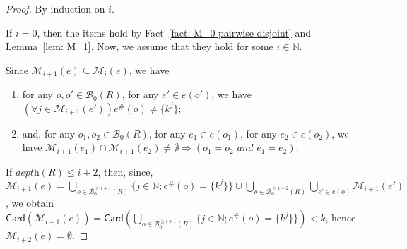 \documentclass{article}
\theoremstyle{plain}
\newcommand{\Nat}{\ensuremath{\mathbb{N}}}
\newcommand{\Card}[1]{\textsf{Card}\left( #1 \right)}
\newcommand{\boxesatzero}[1]{\mathcal{B}_{0}(#1)}
\newcommand{\boxesatzerogeq}[2]{\mathcal{B}_0^{\geq #2}(#1)}
\begin{document}
\begin{proof}
By induction on $i$. 

If $i = 0$, then the items hold by Fact~\ref{fact: M_0 pairwise disjoint} and Lemma~\ref{lem: M_1}. Now, we assume that they hold for some $i \in \Nat$.

Since $\mathcal{M}_{i+1}(e) \subseteq \mathcal{M}_i(e)$, we have 
\begin{enumerate}
\item for any $o, o' \in \boxesatzero{R}$, for any $e' \in e(o')$, we have $(\forall j \in \mathcal{M}_{i+1}(e')) e^\#(o) \not= \{ k^j \}$;
\item and, for any $o_1, o_2 \in \boxesatzero{R}$, for any $e_1 \in e(o_1)$, for any $e_2 \in e(o_2)$, we have $\mathcal{M}_{i+1}(e_1) \cap \mathcal{M}_{i+1}(e_2) \not= \emptyset \Rightarrow (o_1 = o_2 \textit{ and } e_1 = e_2)$.
\end{enumerate}
If $\textit{depth}(R) \leq i+2$, then, since, $\mathcal{M}_{i+1}(e) = \bigcup_{o \in \boxesatzerogeq{R}{i+1}} \{ j \in \Nat ; e^\#(o) = \{ k^j \} \} \cup \bigcup_{o \in \boxesatzerogeq{R}{i+2}} \bigcup_{e' \in e(o)} \mathcal{M}_{i+1}(e')$, 
we obtain $\Card{\mathcal{M}_{i+1}(e)} = \Card{\bigcup_{o \in \boxesatzerogeq{R}{i+1}} \{ j \in \Nat ; e^\#(o) = \{ k^j \} \}} < k$, hence $\mathcal{M}_{i+2}(e) = \emptyset$.


\end{proof}
\end{document}
